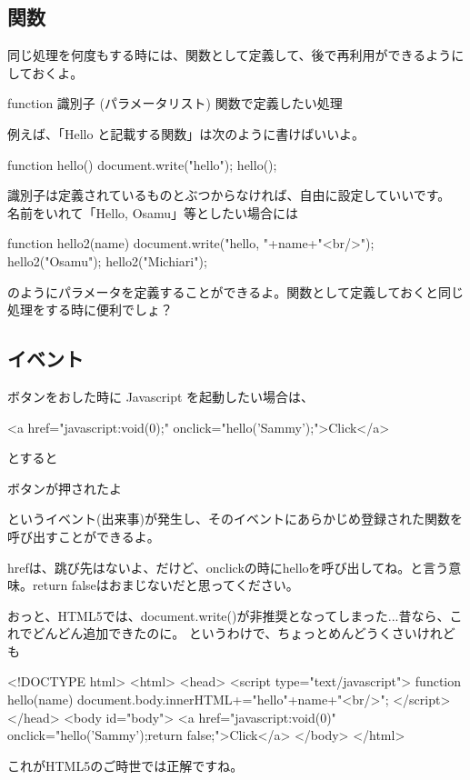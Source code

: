 \documentclass[mingoth,11pt,a4j,uplatex]{jsarticle}
\begin{document}
\subsection{関数}
同じ処理を何度もする時には、関数として定義して、後で再利用ができるようにしておくよ。
\begin{verbatimtab}
function 識別子 (パラメータリスト){
	関数で定義したい処理
}
\end{verbatimtab}
例えば、「Hello と記載する関数」は次のように書けばいいよ。
\begin{verbatimtab}
function hello(){
  document.write("hello");
}
hello();
\end{verbatimtab}
識別子は定義されているものとぶつからなければ、自由に設定していいです。 名前をいれて「Hello, Osamu」等としたい場合には
\begin{verbatimtab}
function hello2(name){
	document.write("hello, "+name+"<br/>");
}
hello2("Osamu");
hello2("Michiari");
\end{verbatimtab}
のようにパラメータを定義することができるよ。関数として定義しておくと同じ処理をする時に便利でしょ？

\subsection{イベント}
ボタンをおした時に Javascript を起動したい場合は、
\begin{verbatimtab}
<a href="javascript:void(0);" onclick="hello('Sammy');">Click</a>
\end{verbatimtab}
とすると
\begin{center}
ボタンが押されたよ
\end{center}
というイベント(出来事)が発生し、そのイベントにあらかじめ登録された関数を呼び出すことができるよ。

hrefは、跳び先はないよ、だけど、onclickの時にhelloを呼び出してね。と言う意味。return falseはおまじないだと思ってください。

おっと、HTML5では、document.write()が非推奨となってしまった...昔なら、これでどんどん追加できたのに。
というわけで、ちょっとめんどうくさいけれども
\begin{verbatimtab}
<!DOCTYPE html>
<html>
	<head>
		<script type="text/javascript">
			function hello(name){
				document.body.innerHTML+="hello"+name+"<br/>";
			}
		</script>
	</head>
	<body id="body">
		<a href="javascript:void(0)" onclick="hello('Sammy');return false;">Click</a>
	</body>
</html>
\end{verbatimtab}
これがHTML5のご時世では正解ですね。
\end{document}
